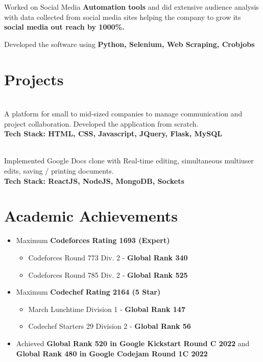 \documentclass[]{ishaan-kamra-resume}
\begin{document}
\begin{minipage}[t]{0.66\textwidth}
\begin{tightemize}
\item Worked on Social Media \textbf{Automation tools} and did extensive audience analysis with data collected from social media sites helping the company to grow its \textbf{social media out reach by 1000\%.}
\item Developed the software using \textbf{Python, Selenium, Web Scraping, Crobjobs}
\end{tightemize}
\sectionsep


\section{Projects}
 \\
A platform for small to mid-sized companies to manage communication and project collaboration. Developed the application from scratch. \\
\textbf{Tech Stack: HTML, CSS, Javascript, JQuery, Flask, MySQL}
\sectionsep

 \\
Implemented Google Docs clone with Real-time editing, simultaneous multiuser edits, saving / printing documents. \\
\textbf{Tech Stack: ReactJS, NodeJS, MongoDB, Sockets}
\sectionsep


\section{Academic Achievements} 
\begin{itemize}
\item Maximum \textbf{Codeforces Rating 1693 (Expert)}
\begin{itemize}
\item Codeforces Round 773 Div. 2 - \textbf{Global Rank 340}
\item Codeforces Round 785 Div. 2 - \textbf{Global Rank 525}
\end{itemize}
\item Maximum \textbf{Codechef Rating 2164 (5 Star)}
\begin{itemize}
\item March Lunchtime Division 1 - \textbf{Global Rank 147}
\item Codechef Starters 29 Division 2 - \textbf{Global Rank 56}
\end{itemize}
\item Achieved \textbf{Global Rank 520 in Google Kickstart Round C 2022} and \textbf{Global Rank 480 in Google Codejam Round 1C 2022}
\end{itemize}
\sectionsep

\end{minipage} 
\end{document}
